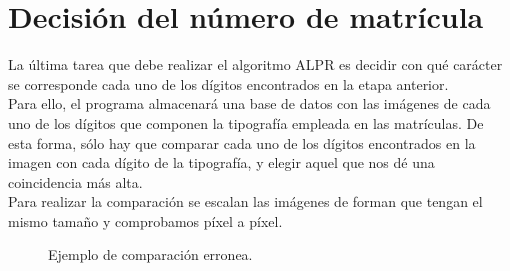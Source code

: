 \section{Decisión del número de matrícula}
La última tarea que debe realizar el algoritmo \ac{ALPR} es decidir con qué carácter se corresponde cada uno de los dígitos encontrados en la etapa anterior.\\

Para ello, el programa almacenará una base de datos con las imágenes de cada uno de los dígitos que componen la tipografía empleada en las matrículas. De esta forma, sólo hay que comparar cada uno de los dígitos encontrados en la imagen con cada dígito de la tipografía, y elegir aquel que nos dé una coincidencia más alta.\\

Para realizar la comparación se escalan las imágenes de forman que tengan el mismo tamaño y comprobamos píxel a píxel.\\

\begin{figure}[!h]
\centering {}
\caption{\small{Ejemplo de comparación erronea.}} \label{ComError}
\end{figure}

